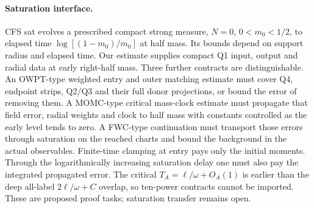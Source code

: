 \documentclass[11pt]{article}
\begin{document}
\paragraph{Saturation interface.}\label{an04ctev1:sat}
CFS sat evolves a prescribed compact strong measure, $N=0$,
$0<m_0<1/2$, to elapsed time $\log[(1-m_0)/m_0]$ at half mass.
Its bounds depend on support radius and elapsed time.
Our estimate supplies compact Q1 input, output and radial data at
early right-half mass. Three further contracts are distinguishable.
An OWPT-type weighted entry and outer matching estimate must cover Q4,
endpoint strips, Q2/Q3 and their full donor projections, or bound the
error of removing them. A MOMC-type critical mass-clock estimate must
propagate that field error, radial weights and clock to half mass
with constants controlled as the early level tends to zero.
A FWC-type continuation must transport those errors through saturation
on the reached charts and bound the background in the actual
observables. Finite-time clamping at entry pays only the initial
moments. Through the logarithmically increasing saturation delay one
must also pay the integrated propagated error. The critical
$T_A=\ell/\omega+O_A(1)$ is earlier than the deep all-label
$2\ell/\omega+C$ overlap, so ten-power contracts cannot be imported.
These are proposed proof tasks; saturation transfer remains open.
\end{document}
